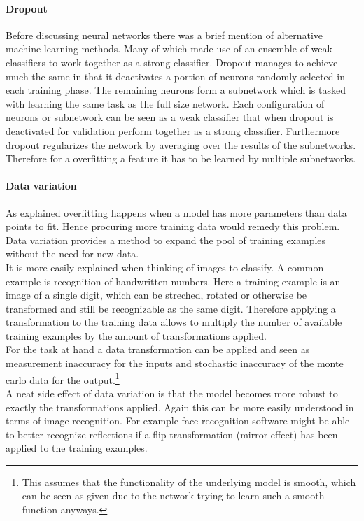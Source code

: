 				\paragraph{Dropout}
					Before discussing neural networks there was a brief mention of alternative machine learning methods. Many of which made use of an ensemble of weak classifiers to work together as a strong classifier. Dropout manages to achieve much the same in that it deactivates a portion of neurons randomly selected in each training phase. The remaining neurons form a subnetwork which is tasked with learning the same task as the full size network. Each configuration of neurons or subnetwork can be seen as a weak classifier that when dropout is deactivated for validation perform together as a strong classifier. Furthermore dropout regularizes the network by averaging over the results of the subnetworks. Therefore for a overfitting a feature it has to be learned by multiple subnetworks.
				\paragraph{Data variation}
					As explained overfitting happens when a model has more parameters than data points to fit. Hence procuring more training data would remedy this problem. Data variation provides a method to expand the pool of training examples without the need for new data.\\
					It is more easily explained when thinking of images to classify. A common example is recognition of handwritten numbers. Here a training example is an image of a single digit, which can be streched, rotated or otherwise be transformed and still be recognizable as the same digit. Therefore applying a transformation to the training data allows to multiply the number of available training examples by the amount of transformations applied.\\
					For the task at hand a data transformation can be applied and seen as measurement inaccuracy for the inputs and stochastic inaccuracy of the monte carlo data for the output.\footnote{This assumes that the functionality of the underlying model is smooth, which can be seen as given due to the network trying to learn such a smooth function anyways.}\\
					A neat side effect of data variation is that the model becomes more robust to exactly the transformations applied. Again this can be more easily understood in terms of image recognition. For example face recognition software might be able to better recognize reflections if a flip transformation (mirror effect) has been applied to the training examples.
